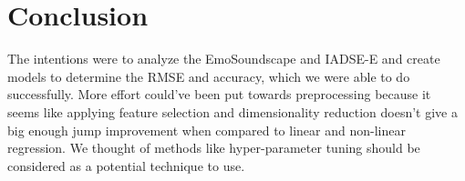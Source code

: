 \documentclass[conference]{IEEEtran}
\begin{document}
\section{Conclusion}
\label{sec:models}
\noindent
The intentions were to analyze the EmoSoundscape and IADSE-E and create models to determine the RMSE and accuracy, which we were able to do successfully. More effort could've been put towards preprocessing because it seems like applying feature selection and dimensionality reduction doesn't give a big enough jump improvement when compared to linear and non-linear regression. We thought of methods like hyper-parameter tuning should be considered as a potential technique to use.



\end{document}
